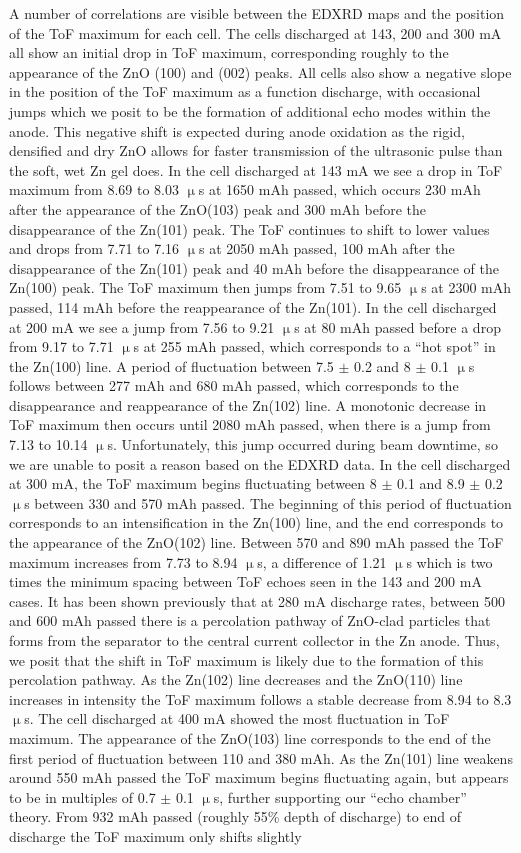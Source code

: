 A number of correlations are visible between the EDXRD maps and the position of the ToF maximum for each cell. The cells discharged at 143, 200 and 300 mA all show an initial drop in ToF maximum, corresponding roughly to the appearance of the ZnO (100) and (002) peaks. All cells also show a negative slope in the position of the ToF maximum as a function discharge, with occasional jumps which we posit to be the formation of additional echo modes within the anode. This negative shift is expected during anode oxidation as the rigid, densified and dry ZnO allows for faster transmission of the ultrasonic pulse than the soft, wet Zn gel does. In the cell discharged at 143 mA we see a drop in ToF maximum from 8.69 to 8.03 $\upmu$s at 1650 mAh passed, which occurs 230 mAh after the appearance of the ZnO(103) peak and 300 mAh before the disappearance of the Zn(101) peak. The ToF continues to shift to lower values and drops from 7.71 to 7.16 $\upmu$s at 2050 mAh passed, 100 mAh after the disappearance of the Zn(101) peak and 40 mAh before the disappearance of the Zn(100) peak. The ToF maximum then jumps from 7.51 to 9.65 $\upmu$s at 2300 mAh passed, 114 mAh before the reappearance of the Zn(101). In the cell discharged at 200 mA we see a jump from 7.56 to 9.21 $\upmu$s at 80 mAh passed before a drop from 9.17 to 7.71 $\upmu$s at 255 mAh passed, which corresponds to a “hot spot” in the Zn(100) line. A period of fluctuation between 7.5 $\pm$ 0.2 and 8 $\pm$ 0.1 $\upmu$s follows between 277 mAh and 680 mAh passed, which corresponds to the disappearance and reappearance of the Zn(102) line. A monotonic decrease in ToF maximum then occurs until 2080 mAh passed, when there is a jump from 7.13 to 10.14 $\upmu$s. Unfortunately, this jump occurred during beam downtime, so we are unable to posit a reason based on the EDXRD data. In the cell discharged at 300 mA, the ToF maximum begins fluctuating between 8 $\pm$ 0.1 and 8.9 $\pm$ 0.2 $\upmu$s between 330 and 570 mAh passed. The beginning of this period of fluctuation corresponds to an intensification in the Zn(100) line, and the end corresponds to the appearance of the ZnO(102) line. Between 570 and 890 mAh passed the ToF maximum increases from 7.73 to 8.94 $\upmu$s, a difference of 1.21 $\upmu$s which is two times the minimum spacing between ToF echoes seen in the 143 and 200 mA cases. It has been shown previously that at 280 mA discharge rates, between 500 and 600 mAh passed there is a percolation pathway of ZnO-clad particles that forms from the separator to the central current collector in the Zn anode. Thus, we posit that the shift in ToF maximum is likely due to the formation of this percolation pathway. As the Zn(102) line decreases and the ZnO(110) line increases in intensity the ToF maximum follows a stable decrease from 8.94 to 8.3 $\upmu$s. The cell discharged at 400 mA showed the most fluctuation in ToF maximum. The appearance of the ZnO(103) line corresponds to the end of the first period of fluctuation between 110 and 380 mAh. As the Zn(101) line weakens around 550 mAh passed the ToF maximum begins fluctuating again, but appears to be in multiples of 0.7 $\pm$ 0.1 $\upmu$s, further supporting our “echo chamber” theory. From 932 mAh passed (roughly 55\% depth of discharge) to end of discharge the ToF maximum only shifts slightly 